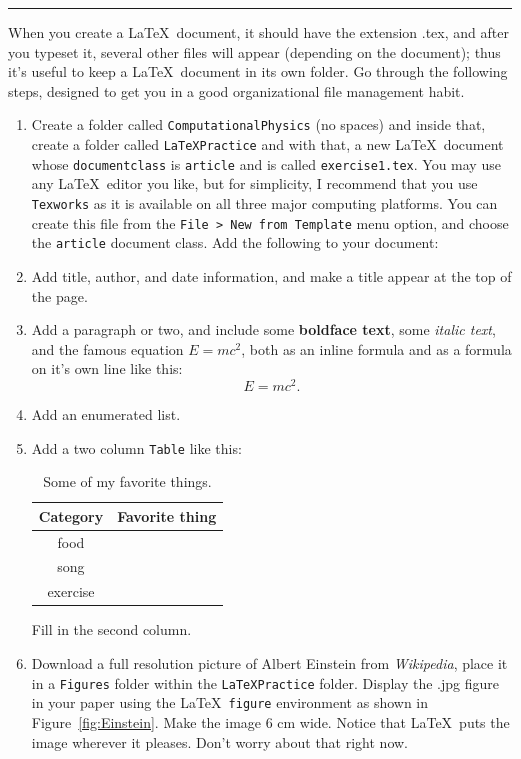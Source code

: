 \rule{\textwidth}{1pt}
\begin{exercise}\label{ex:latexStep1}
When you create a \LaTeX\ document, it should have the extension .tex, and after you typeset it, several other files will appear (depending on the document); thus it's useful to keep a \LaTeX\ document in its own folder. Go through the following steps, designed to get you in a good organizational file management habit.
\begin{enumerate}
	\item Create a folder called \texttt{ComputationalPhysics} (no spaces) and inside that, create a folder called \texttt{LaTeXPractice} and with that, a new \LaTeX\ document whose \texttt{documentclass} is \texttt{article} and is called	\texttt{exercise1.tex}. You may use any \LaTeX\ editor you like, but for simplicity, I recommend that you use \texttt{Texworks} as it is available on all three major computing platforms. You can create this file from the \texttt{File > New from Template} menu option, and choose the \texttt{article} document class. Add the following to your document:
	\item Add title, author, and date information, and make a title appear at the top of the page. 
	\item Add a paragraph or two, and include some \textbf{boldface text}, some \textit{italic text}, and the famous equation 
	$E = m c^2$, both as an inline formula and as a formula on it's own line like this:\\
	$$ E = m c^2. $$
	\item Add an enumerated list.
	\item Add a two column \texttt{Table} like this:
	\begin{table}\centering
		\begin{tabular}{c l}\\ \hline
			Category & Favorite thing\\ \hline
			food & \\
			song & \\
			exercise & \\ \hline
		\end{tabular} 
	\caption{Some of my favorite things.}
	\end{table}
    Fill in the second column.
	\item Download a full resolution picture of Albert Einstein from \textit{Wikipedia}, place it in a \texttt{Figures} folder within the \texttt{LaTeXPractice} folder. Display the .jpg figure in your paper using the \LaTeX\ \texttt{figure} environment as shown in Figure~\ref{fig:Einstein}. Make the image 6 cm wide. Notice that \LaTeX\ puts the image wherever it pleases. Don't worry about that right now. 

\end{enumerate}
\end{exercise}
